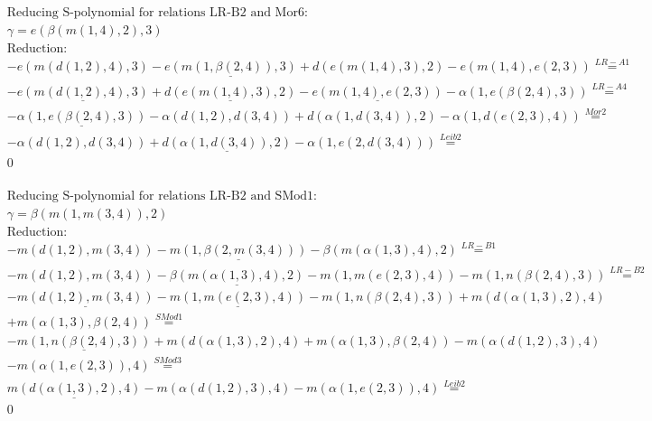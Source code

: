 \documentclass[11pt]{amsart}
\begin{document}
\begin{align*} 
& \text{Reducing S-polynomial for relations LR-B2 and Mor6:} \\ 
& \gamma = e(\beta(m(1,4),2),3) \\ 
& \text{Reduction}: \\& - e(m(d(1,2),4),3) - \underline{e(m(1,\beta(2,4)),3)} + d(e(m(1,4),3),2) - e(m(1,4),e(2,3)) \stackrel{ LR-A1 }{=}  \\ 
& - \underline{e(m(d(1,2),4),3)} + \underline{d(e(m(1,4),3),2)} - \underline{e(m(1,4),e(2,3))} - \alpha(1,e(\beta(2,4),3)) \stackrel{ LR-A4 }{=}  \\ 
& - \underline{\alpha(1,e(\beta(2,4),3))} - \alpha(d(1,2),d(3,4)) + d(\alpha(1,d(3,4)),2) - \alpha(1,d(e(2,3),4)) \stackrel{ Mor2 }{=}  \\ 
& - \alpha(d(1,2),d(3,4)) + \underline{d(\alpha(1,d(3,4)),2)} - \alpha(1,e(2,d(3,4))) \stackrel{ Leib2 }{=}  \\ 
&0\\ 
\end{align*} 
 
\begin{align*} 
& \text{Reducing S-polynomial for relations LR-B2 and SMod1:} \\ 
& \gamma = \beta(m(1,m(3,4)),2) \\ 
& \text{Reduction}: \\& - m(d(1,2),m(3,4)) - \underline{m(1,\beta(2,m(3,4)))} - \beta(m(\alpha(1,3),4),2) \stackrel{ LR-B1 }{=}  \\ 
& - m(d(1,2),m(3,4)) - \underline{\beta(m(\alpha(1,3),4),2)} - m(1,m(e(2,3),4)) - m(1,n(\beta(2,4),3)) \stackrel{ LR-B2 }{=}  \\ 
& - \underline{m(d(1,2),m(3,4))} - \underline{m(1,m(e(2,3),4))} - m(1,n(\beta(2,4),3)) + m(d(\alpha(1,3),2),4)\\ 
 &  + m(\alpha(1,3),\beta(2,4)) \stackrel{ SMod1 }{=}  \\ 
& - \underline{m(1,n(\beta(2,4),3))} + m(d(\alpha(1,3),2),4) + m(\alpha(1,3),\beta(2,4)) - m(\alpha(d(1,2),3),4)\\ 
 &  - m(\alpha(1,e(2,3)),4) \stackrel{ SMod3 }{=}  \\ 
&\underline{m(d(\alpha(1,3),2),4)} - m(\alpha(d(1,2),3),4) - m(\alpha(1,e(2,3)),4) \stackrel{ Leib2 }{=}  \\ 
&0\\ 
\end{align*} 
 
\end{document}

